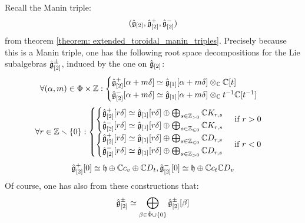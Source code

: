         \begin{corollary}
            Recall the Manin triple:
                $$(\hat{\mathfrak{g}}_{[2]}, \hat{\mathfrak{g}}_{[2]}^+, \hat{\mathfrak{g}}_{[2]}^-)$$
            from theorem \ref{theorem: extended_toroidal_manin_triples}. Precisely because this is a Manin triple, one has the following root space decompositions for the Lie subalgebras $\hat{\mathfrak{g}}_{[2]}^{\pm}$, induced by the one on $\hat{\mathfrak{g}}_{[2]}$:
                $$
                    \forall (\alpha, m) \in \Phi \x \Z:
                    \begin{cases}
                        \hat{\g}_{[2]}^+[\alpha + m\delta] \cong \hat{\g}_{[1]}[\alpha + m\delta] \tensor_{\bbC} \bbC[t]
                        \\
                        \hat{\g}_{[2]}^-[\alpha + m\delta] \cong \hat{\g}_{[1]}[\alpha + m\delta] \tensor_{\bbC} t^{-1}\bbC[t^{-1}]
                    \end{cases}
                $$
                $$
                    \forall r \in \mathbb{Z} \smallsetminus \{0\}:
                    \begin{cases}
                        \text{$
                        \begin{cases}
                            \hat{\mathfrak{g}}_{[2]}^+[r \delta] \simeq \hat{\mathfrak{g}}_{[1]}[r \delta] \oplus \bigoplus_{s \in \mathbb{Z}_{> 0}} \mathbb{C} K_{r, s}
                            \\
                            \hat{\mathfrak{g}}_{[2]}^-[r \delta] \simeq \hat{\mathfrak{g}}_{[1]}[r \delta] \oplus \bigoplus_{s \in \mathbb{Z}_{\leqslant 0}} \mathbb{C} K_{r, s}
                        \end{cases}
                        $ if $r > 0$}
                        \\
                        \text{$
                        \begin{cases}
                            \hat{\mathfrak{g}}_{[2]}^+[r \delta] \simeq \hat{\mathfrak{g}}_{[1]}[r \delta] \oplus \bigoplus_{s \in \mathbb{Z}_{\leqslant 0}} \mathbb{C} D_{r, s}
                            \\
                            \hat{\mathfrak{g}}_{[2]}^-[r \delta] \simeq \hat{\mathfrak{g}}_{[1]}[r \delta] \oplus \bigoplus_{s \in \mathbb{Z}_{> 0}} \mathbb{C} D_{r, s}
                        \end{cases}
                        $ if $r < 0$}
                    \end{cases}
                $$
                $$\hat{\mathfrak{g}}_{[2]}^+[0] \simeq \mathfrak{h} \oplus \mathbb{C} c_v \oplus \mathbb{C} D_t, \hat{\mathfrak{g}}_{[2]}^-[0] \simeq \mathfrak{h} \oplus \mathbb{C} c_t \mathbb{C} D_v$$
            Of course, one has also from these constructions that:
                $$\hat{\mathfrak{g}}_{[2]}^{\pm} \simeq \bigoplus_{\beta \in \hat{\Phi} \cup \{0\}} \hat{\mathfrak{g}}_{[2]}^{\pm}[\beta]$$
        \end{corollary}
        
